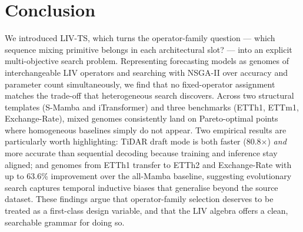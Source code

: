 \section{Conclusion}
\label{sec:conclusion}

We introduced LIV-TS, which turns the operator-family question — which sequence mixing primitive belongs in each architectural slot? — into an explicit multi-objective search problem.
Representing forecasting models as genomes of interchangeable LIV operators and searching with NSGA-II over accuracy and parameter count simultaneously, we find that no fixed-operator assignment matches the trade-off that heterogeneous search discovers.
Across two structural templates (S-Mamba and iTransformer) and three benchmarks (ETTh1, ETTm1, Exchange-Rate), mixed genomes consistently land on Pareto-optimal points where homogeneous baselines simply do not appear.
Two empirical results are particularly worth highlighting: TiDAR draft mode is both faster (80.8$\times$) \emph{and} more accurate than sequential decoding because training and inference stay aligned; and genomes from ETTh1 transfer to ETTh2 and Exchange-Rate with up to 63.6\% improvement over the all-Mamba baseline, suggesting evolutionary search captures temporal inductive biases that generalise beyond the source dataset.
These findings argue that operator-family selection deserves to be treated as a first-class design variable, and that the LIV algebra offers a clean, searchable grammar for doing so.
